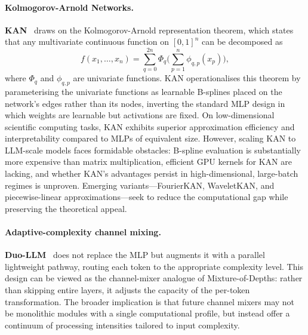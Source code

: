 \paragraph{Kolmogorov-Arnold Networks.}
\textbf{KAN}~\cite{liu2024kan} draws on the Kolmogorov-Arnold representation theorem, which states that any multivariate continuous function on $[0,1]^n$ can be decomposed as
\begin{equation}
\label{eq:kan}
f(x_1, \ldots, x_n) = \sum_{q=0}^{2n} \Phi_q\!\Biggl(\sum_{p=1}^{n} \phi_{q,p}(x_p)\Biggr),
\end{equation}
where $\Phi_q$ and $\phi_{q,p}$ are univariate functions.
KAN operationalises this theorem by parameterising the univariate functions as learnable B-splines placed on the network's edges rather than its nodes, inverting the standard MLP design in which weights are learnable but activations are fixed.
On low-dimensional scientific computing tasks, KAN exhibits superior approximation efficiency and interpretability compared to MLPs of equivalent size.
However, scaling KAN to LLM-scale models faces formidable obstacles: B-spline evaluation is substantially more expensive than matrix multiplication, efficient GPU kernels for KAN are lacking, and whether KAN's advantages persist in high-dimensional, large-batch regimes is unproven.
Emerging variants---FourierKAN, WaveletKAN, and piecewise-linear approximations---seek to reduce the computational gap while preserving the theoretical appeal.

\paragraph{Adaptive-complexity channel mixing.}
\textbf{Duo-LLM}~\cite{duollm2024} does not replace the MLP but augments it with a parallel lightweight pathway, routing each token to the appropriate complexity level.
This design can be viewed as the channel-mixer analogue of Mixture-of-Depths: rather than skipping entire layers, it adjusts the capacity of the per-token transformation.
The broader implication is that future channel mixers may not be monolithic modules with a single computational profile, but instead offer a continuum of processing intensities tailored to input complexity.

